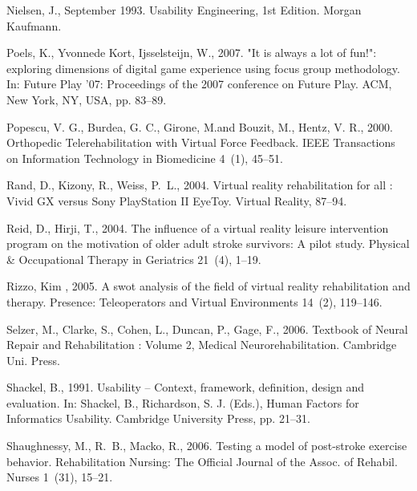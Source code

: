 \documentclass[preprint,authoryear,12pt]{elsarticle}
\begin{document}
\begin{thebibliography}{40}
{Nielsen, J.}, {September} 1993. {Usability Engineering}, {1st} Edition.
  {Morgan Kaufmann}.

Poels, K., Yvonne{de Kort}, Ijsselsteijn, W., 2007. {"It is always a lot of
  fun!": exploring dimensions of digital game experience using focus group
  methodology}. In: {Future Play '07: Proceedings of the 2007 conference on
  Future Play}. ACM, {New York, NY, USA}, pp. 83--89.

{Popescu, V. G.}, {Burdea, G. C.}, {Girone, M.}and {Bouzit, M.}, {Hentz, V.
  R.}, 2000. {Orthopedic Telerehabilitation with Virtual Force Feedback}. {IEEE
  Transactions on Information Technology in Biomedicine} 4~(1), 45--51.

Rand, D., Kizony, R., Weiss, P.~L., 2004. {Virtual reality rehabilitation for
  all : Vivid GX versus Sony PlayStation II EyeToy}. Virtual Reality, 87--94.

Reid, D., Hirji, T., 2004. {The influence of a virtual reality leisure
  intervention program on the motivation of older adult stroke survivors: A
  pilot study}. Physical \& Occupational Therapy in Geriatrics 21~(4), 1--19.

Rizzo, Kim , 2005. A swot analysis of the field of virtual reality
  rehabilitation and therapy. Presence: Teleoperators and Virtual Environments
  14~(2), 119--146.

Selzer, M., Clarke, S., Cohen, L., Duncan, P., Gage, F., 2006. Textbook of
  Neural Repair and Rehabilitation : Volume 2, Medical Neurorehabilitation.
  Cambridge Uni. Press.

Shackel, B., 1991. {Usability -- Context, framework, definition, design and
  evaluation}. In: {Shackel, B.}, {Richardson, S. J.} (Eds.), {Human Factors
  for Informatics Usability}. {Cambridge University Press}, pp. 21--31.

Shaughnessy, M., R.~B., Macko, R., 2006. {Testing a model of post-stroke
  exercise behavior.} Rehabilitation Nursing: The Official Journal of the
  Assoc. of Rehabil. Nurses 1~(31), 15--21.


\end{thebibliography}
\end{document}

